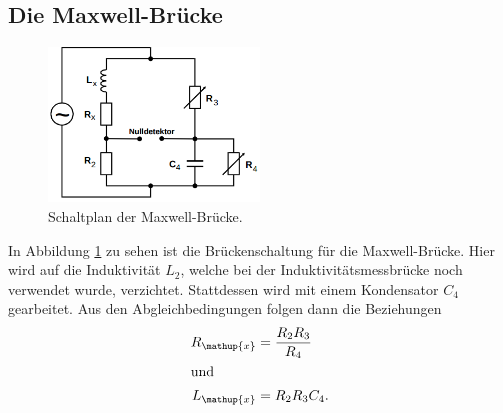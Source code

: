 \documentclass[
  bibliography=totoc,     %
  captions=tableheading,  %
  titlepage=firstiscover, %
]{scrartcl}
\begin{document}
\subsection{Die Maxwell-Brücke}
\begin{figure}[htb]
  \centering
  \includegraphics[width=0.5\textwidth]{V3025.png}
  \caption{Schaltplan der Maxwell-Brücke. \cite{anleitung}}
  \label{fig:V3025}
\end{figure}
In Abbildung \ref{fig:V3025} zu sehen ist die Brückenschaltung für die
Maxwell-Brücke. Hier wird auf die Induktivität $L_2$, welche bei der Induktivitätsmessbrücke
noch verwendet wurde, verzichtet. Stattdessen wird mit einem Kondensator $C_4$
gearbeitet. Aus den Abgleichbedingungen folgen dann die Beziehungen
\begin{align}
    \label{eqn:maxwell_R}
    R_{\mathup{x}} &= \frac{R_2 R_3}{R_4} \\
    \shortintertext{und}
    \label{eqn:maxwell_L}
    L_{\mathup{x}} &= R_2 R_3 C_4.
\end{align}

\newpage
\end{document}
